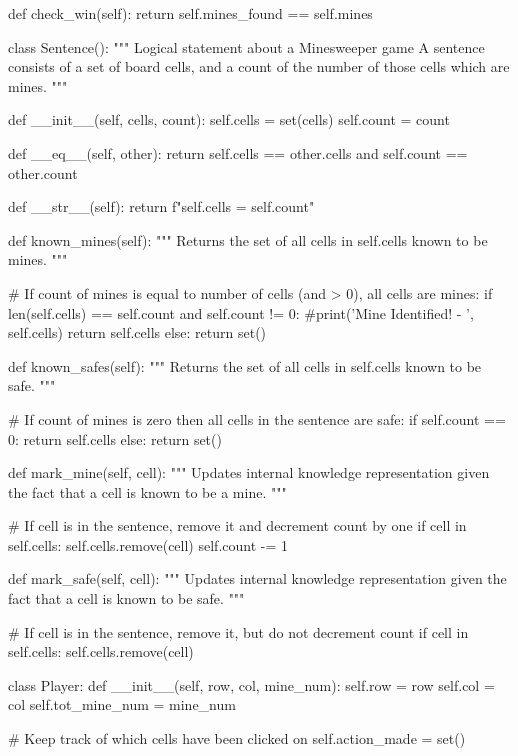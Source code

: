 \documentclass{article} %
\begin{document}
\begin{code}
    def check_win(self):
        return self.mines_found == self.mines
    
class Sentence():
    """
    Logical statement about a Minesweeper game
    A sentence consists of a set of board cells,
    and a count of the number of those cells which are mines.
    """

    def __init__(self, cells, count):
        self.cells = set(cells)
        self.count = count

    def __eq__(self, other):
        return self.cells == other.cells and self.count == other.count

    def __str__(self):
        return f"{self.cells} = {self.count}"

    def known_mines(self):
        """
        Returns the set of all cells in self.cells known to be mines.
        """

        # If count of mines is equal to number of cells (and > 0), all cells are mines:
        if len(self.cells) == self.count and self.count != 0:
            #print('Mine Identified! - ', self.cells)
            return self.cells
        else:
            return set()

    def known_safes(self):
        """
        Returns the set of all cells in self.cells known to be safe.
        """

        # If count of mines is zero then all cells in the sentence are safe:
        if self.count == 0:
            return self.cells
        else:
            return set()

    def mark_mine(self, cell):
        """
        Updates internal knowledge representation given the fact that
        a cell is known to be a mine.
        """

        # If cell is in the sentence, remove it and decrement count by one
        if cell in self.cells:
            self.cells.remove(cell)
            self.count -= 1

    def mark_safe(self, cell):
        """
        Updates internal knowledge representation given the fact that
        a cell is known to be safe.
        """

        # If cell is in the sentence, remove it, but do not decrement count
        if cell in self.cells:
            self.cells.remove(cell)

class Player:
    def __init__(self, row, col, mine_num):
        self.row = row
        self.col = col
        self.tot_mine_num = mine_num

        # Keep track of which cells have been clicked on
        self.action_made = set()


\end{code}
\end{document}
